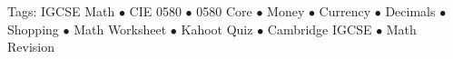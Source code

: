 \documentclass[11pt,a4paper]{article}
\begin{document}
\vspace{14pt}
\begin{center}
  \sffamily\scriptsize\textcolor{textmuted}{
    Tags: IGCSE Math $\bullet$ CIE 0580 $\bullet$ 0580 Core $\bullet$ Money $\bullet$ Currency $\bullet$ Decimals $\bullet$ Shopping $\bullet$ Math Worksheet $\bullet$ Kahoot Quiz $\bullet$ Cambridge IGCSE $\bullet$ Math Revision
  }
\end{center}
\end{document}

